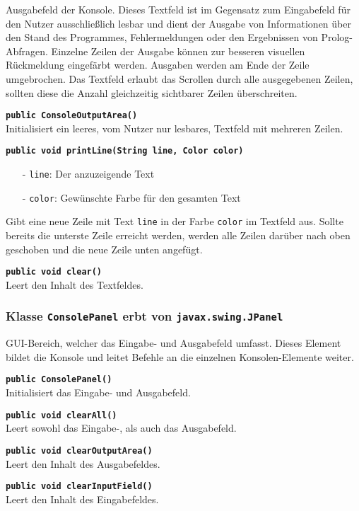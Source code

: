\documentclass[parskip=full,11pt,twoside]{scrartcl}
\begin{document}
Ausgabefeld der Konsole. Dieses Textfeld ist im Gegensatz zum Eingabefeld für den Nutzer ausschließlich lesbar und dient der Ausgabe von Informationen über den Stand des Programmes, Fehlermeldungen oder den Ergebnissen von Prolog-Abfragen. Einzelne Zeilen der Ausgabe können zur besseren visuellen Rückmeldung eingefärbt werden. Ausgaben werden am Ende der Zeile umgebrochen. Das Textfeld erlaubt das Scrollen durch alle ausgegebenen Zeilen, sollten diese die Anzahl gleichzeitig sichtbarer Zeilen überschreiten.

\textbf{\texttt{public ConsoleOutputArea()}}\\
Initialisiert ein leeres, vom Nutzer nur lesbares, Textfeld mit mehreren Zeilen.

\textbf{\texttt{public void printLine(String line, Color color)}}
\begin{itemize}[noitemsep]
	\item[-] \texttt{line}: Der anzuzeigende Text
	\item[-] \texttt{color}: Gewünschte Farbe für den gesamten Text
\end{itemize}
Gibt eine neue Zeile mit Text \texttt{line} in der Farbe \texttt{color} im Textfeld aus. Sollte bereits die unterste Zeile erreicht werden, werden alle Zeilen darüber nach oben geschoben und die neue Zeile unten angefügt.

\textbf{\texttt{public void clear()}}\\
Leert den Inhalt des Textfeldes.

\subsubsection{Klasse \texttt{ConsolePanel} erbt von \texttt{javax.swing.JPanel}}

GUI-Bereich, welcher das Eingabe- und Ausgabefeld umfasst. Dieses Element bildet die Konsole und leitet Befehle an die einzelnen Konsolen-Elemente weiter.

\textbf{\texttt{public ConsolePanel()}}\\
Initialisiert das Eingabe- und Ausgabefeld.

\textbf{\texttt{public void clearAll()}}\\
Leert sowohl das Eingabe-, als auch das Ausgabefeld.

\textbf{\texttt{public void clearOutputArea()}}\\
Leert den Inhalt des Ausgabefeldes.

\textbf{\texttt{public void clearInputField()}}\\
Leert den Inhalt des Eingabefeldes.
\end{document}
